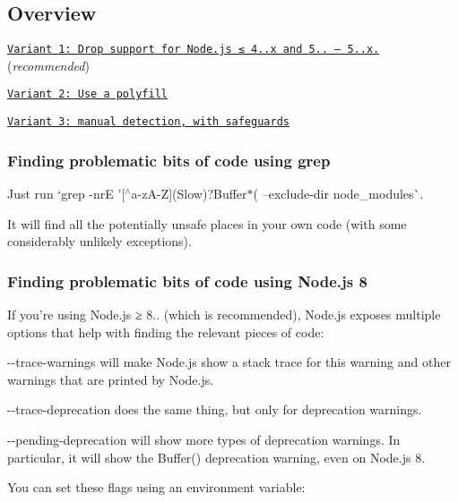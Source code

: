 \subsection*{Overview}


\begin{DoxyItemize}
\item \href{#variant-1}{\tt Variant 1\+: Drop support for Node.\+js ≤ 4..\+x and 5.. — 5..\+x.} ({\itshape recommended})
\item \href{#variant-2}{\tt Variant 2\+: Use a polyfill}
\item \href{#variant-3}{\tt Variant 3\+: manual detection, with safeguards}
\end{DoxyItemize}

\subsubsection*{Finding problematic bits of code using grep}

Just run `grep -\/nrE '\mbox{[}$^\wedge$a-\/z\+A-\/Z\mbox{]}(Slow)?Buffer$\ast$(\textquotesingle{} --exclude-\/dir node\+\_\+modules\`{}.

It will find all the potentially unsafe places in your own code (with some considerably unlikely exceptions).

\subsubsection*{Finding problematic bits of code using Node.\+js 8}

If you’re using Node.\+js ≥ 8.. (which is recommended), Node.\+js exposes multiple options that help with finding the relevant pieces of code\+:


\begin{DoxyItemize}
\item {\ttfamily -\/-\/trace-\/warnings} will make Node.\+js show a stack trace for this warning and other warnings that are printed by Node.\+js.
\item {\ttfamily -\/-\/trace-\/deprecation} does the same thing, but only for deprecation warnings.
\item {\ttfamily -\/-\/pending-\/deprecation} will show more types of deprecation warnings. In particular, it will show the {\ttfamily Buffer()} deprecation warning, even on Node.\+js 8.
\end{DoxyItemize}

You can set these flags using an environment variable\+:


